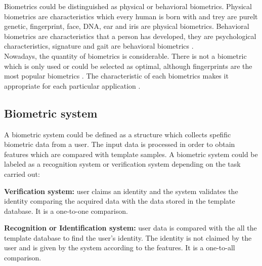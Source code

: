 Biometrics could be distinguished as physical or behavioral biometrics. Physical biometrics are characteristics which every human is born with and trey are purelt genetic, fingerprint, face, DNA, ear and iris are physical biometrics. Behavioral biometrics are characteristics that a person has developed, they are  psychological characteristics, signature and gait are behavioral biometrics \cite{biometrics_beha}.\\

Nowadays, the quantity of biometrics is considerable. There is not a biometric which is only used or could be selected as optimal, although fingerprints are the most popular biometrics \cite{2d_3d_face}. The characteristic of each biometrics makes it appropriate for each particular application \cite{Intro_biometrics}.\\%



\subsection{Biometric system}
A biometric system could be defined as a structure which collects spefific biometric data from a user. The input data is processed in order to obtain features which are compared with template samples. A biometric system could be labeled as a recognition system or verification system depending on the task carried out\cite{Intro_biometrics2}:
\begin{description}[itemsep=2pt,topsep=8pt,parsep=0pt,partopsep=20pt]
\item \textbf{Verification system:} user claims an identity and the system validates the identity comparing the acquired data with the data stored in the template database. It is a one-to-one comparison.
\item \textbf{Recognition or Identification system:} user data is compared with the all the template database to find the user's identity. The identity is not claimed by the user and is given by the system according to the features. It is a one-to-all comparison.
\end{description}

